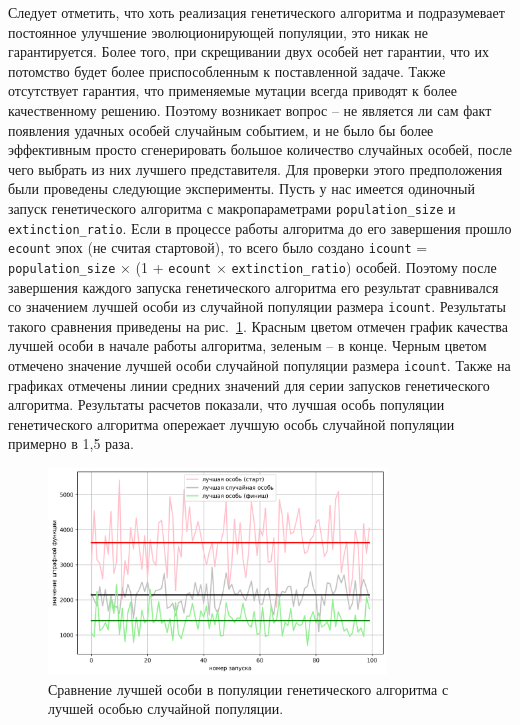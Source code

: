Следует отметить, что хоть реализация генетического алгоритма и подразумевает постоянное улучшение эволюционирующей популяции, это никак не гарантируется.
Более того, при скрещивании двух особей нет гарантии, что их потомство будет более приспособленным к поставленной задаче.
Также отсутствует гарантия, что применяемые мутации всегда приводят к более качественному решению.
Поэтому возникает вопрос -- не является ли сам факт появления удачных особей случайным событием, и не было бы более эффективным просто сгенерировать большое количество случайных особей, после чего выбрать из них лучшего представителя.
Для проверки этого предположения были проведены следующие эксперименты.
Пусть у нас имеется одиночный запуск генетического алгоритма с макропараметрами \texttt{population\_size} и \texttt{extinction\_ratio}.
Если в процессе работы алгоритма до его завершения прошло \texttt{ecount} эпох (не считая стартовой), то всего было создано \texttt{icount} = \texttt{population\_size} × (1 + \texttt{ecount} × \texttt{extinction\_ratio}) особей.
Поэтому после завершения каждого запуска генетического алгоритма его результат сравнивался со значением лучшей особи из случайной популяции размера \texttt{icount}.
Результаты такого сравнения приведены на рис.~\ref{fig:text_2_genetic_chart2}.
Красным цветом отмечен график качества лучшей особи в начале работы алгоритма, зеленым -- в конце.
Черным цветом отмечено значение лучшей особи случайной популяции размера \texttt{icount}.
Также на графиках отмечены линии средних значений для серии запусков генетического алгоритма.
Результаты расчетов показали, что лучшая особь популяции генетического алгоритма опережает лучшую особь случайной популяции примерно в 1,5 раза.

\begin{figure}[ht]
\centering
\includegraphics[width=0.8\textwidth]{./pics/text_2_genetic/chart2.png}
\singlespacing
{}\caption{Сравнение лучшей особи в популяции генетического алгоритма с лучшей особью случайной популяции.}
\label{fig:text_2_genetic_chart2}
\end{figure}


